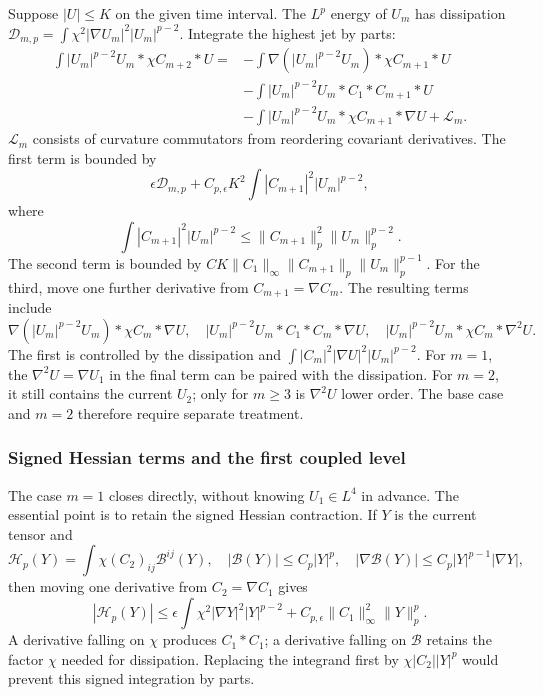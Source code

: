\documentclass[a4paper,11pt]{article}
\numberwithin{equation}{section}
\theoremstyle{definition}
\begin{document}
Suppose $|U|\le K$ on the given time interval. The $L^p$ energy of $U_m$
has dissipation $\mathcal D_{m,p}=\int\chi^2|\nabla U_m|^2|U_m|^{p-2}$.
Integrate the highest jet by parts:
\begin{align*}
\int |U_m|^{p-2}U_m*\chi C_{m+2}*U
={}&-\int\nabla(|U_m|^{p-2}U_m)*\chi C_{m+1}*U\\
&-\int|U_m|^{p-2}U_m*C_1*C_{m+1}*U\\
&-\int|U_m|^{p-2}U_m*\chi C_{m+1}*\nabla U
+\mathcal L_m .
\end{align*}
$\mathcal L_m$ consists of curvature commutators from reordering covariant derivatives. The first term is bounded by
\[
\epsilon\mathcal D_{m,p}
+C_{p,\epsilon}K^2\int|C_{m+1}|^2|U_m|^{p-2},
\]
where
\[
\int|C_{m+1}|^2|U_m|^{p-2}
\le\|C_{m+1}\|_p^2\|U_m\|_p^{p-2}.
\]
The second term is bounded by $CK\|C_1\|_\infty\|C_{m+1}\|_p\|U_m\|_p^{p-1}$.
For the third, move one further derivative from $C_{m+1}=\nabla C_m$. The resulting terms include
\[
\nabla(|U_m|^{p-2}U_m)*\chi C_m*\nabla U,\quad
|U_m|^{p-2}U_m*C_1*C_m*\nabla U,\quad
|U_m|^{p-2}U_m*\chi C_m*\nabla^2U.
\]
The first is controlled by the dissipation and $\int|C_m|^2|\nabla U|^2|U_m|^{p-2}$.
For $m=1$, the $\nabla^2U=\nabla U_1$ in the final term can be paired with the dissipation.
For $m=2$, it still contains the current $U_2$; only for $m\ge3$ is $\nabla^2U$ lower order.
The base case and $m=2$ therefore require separate treatment.

\subsubsection{Signed Hessian terms and the first coupled level}\label{sec:jet-base-pair}
The case $m=1$ closes directly, without knowing $U_1\in L^4$ in advance.
The essential point is to retain the signed Hessian contraction. If $Y$ is the current tensor and
\[
\mathcal H_p(Y)=\int\chi(C_2)_{ij}\mathcal B^{ij}(Y),\quad
|\mathcal B(Y)|\le C_p|Y|^p,\quad
|\nabla\mathcal B(Y)|\le C_p|Y|^{p-1}|\nabla Y|,
\]
then moving one derivative from $C_2=\nabla C_1$ gives
\begin{equation}\label{eq:signed-hessian}
|\mathcal H_p(Y)|\le
\epsilon\int\chi^2|\nabla Y|^2|Y|^{p-2}
+C_{p,\epsilon}\|C_1\|_\infty^2\|Y\|_p^p.
\end{equation}
A derivative falling on $\chi$ produces $C_1*C_1$; a derivative falling on $\mathcal B$ retains
the factor $\chi$ needed for dissipation. Replacing the integrand first by
$\chi|C_2||Y|^p$ would prevent this signed integration by parts.
\end{document}

